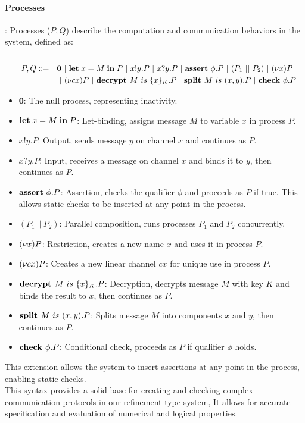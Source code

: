 \documentclass[master,english]{kuisthesis}
\theoremstyle{definition}
\begin{document}
\paragraph{Processes}:
Processes (\(P, Q\)) describe the computation and communication behaviors in the system, defined as:
    \begin{alignat*}{2}
    \\\text{\textbf{}} & \quad & P, Q ::= \quad & \mathbf{0} ~|~ \mathbf{let}\;{x} = {M}\;\mathbf{in}\;{P} ~|~ x!y.P ~|~ x?y.P  ~|~ \mathbf{assert}\ {\phi}.P ~|~(P_1 ~||~ P_2) ~|~ (\nu {x})P \\
   &\quad&\quad& ~|~ (\nu {cx})P ~|~ \textbf{decrypt }{M}~is~\{{x}\}_{K}.P ~|~ \textbf{split }{M}~is~ ({x},{y}).P 
    ~|~ \textbf{check }{\phi}.P
  \end{alignat*}
\begin{itemize}
    \item \(\mathbf{0}\): The null process, representing inactivity.
    \item \(\mathbf{let}\;{x} = {M}\;\mathbf{in}\;{P}\): Let-binding, assigns message \(M\) to variable \(x\) in process \(P\).
    \item \(x!y.P\): Output, sends message \(y\) on channel \(x\) and continues as \(P\).
    \item \(x?y.P\): Input, receives a message on channel \(x\) and binds it to \(y\), then continues as \(P\).
    \item \(\mathbf{assert}\ {\phi}.P\): Assertion, checks the qualifier \(\phi\) and proceeds as \(P\) if true. This allows static checks to be inserted at any point in the process.
    \item \((P_1 ~||~ P_2)\): Parallel composition, runs processes \(P_1\) and \(P_2\) concurrently.
    \item \((\nu {x})P\): Restriction, creates a new name \(x\) and uses it in process \(P\).
    \item \((\nu {cx})P\): Creates a new linear channel \(cx\) for unique use in process \(P\).
    \item \(\textbf{decrypt }{M}~is~\{{x}\}_{K}.P\): Decryption, decrypts message \(M\) with key \(K\) and binds the result to \(x\), then continues as \(P\).
    \item \(\textbf{split }{M}~is~ ({x},{y}).P\): Splits message \(M\) into components \(x\) and \(y\), then continues as \(P\).
    \item \(\textbf{check }{\phi}.P\): Conditional check, proceeds as \(P\) if qualifier \(\phi\) holds.
\end{itemize}
This extension allows the system to insert assertions at any point in the process, enabling static checks.\\
This syntax provides a solid base for creating and checking complex communication protocols in our refinement type system, It allows for accurate specification and evaluation of numerical and logical properties.
\end{document}
